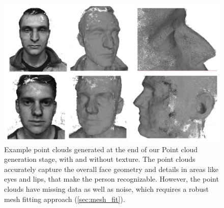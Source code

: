 \begin{figure}[t]
\begin{center}
   \includegraphics[width=0.95\linewidth]{images/point_clouds_sample.png}
\end{center}
   \caption{Example point clouds generated at the end of our Point cloud generation stage, with and without texture. The point clouds accurately capture the overall face geometry and details in areas like eyes and lips, that make the person recognizable. However, the point clouds have missing data as well as noise, which requires a robust mesh fitting approach (\ref{sec:mesh_fit}).}
\label{fig:pcl_sample}
\end{figure}
